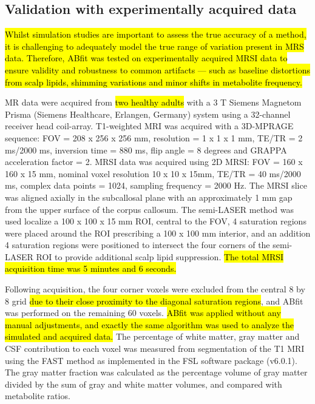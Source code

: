 \documentclass[num-refs]{wiley-article}
\newcommand{\revone}[2]{\hl{#1}\marginnote{\hl{#2}}}
\begin{document}
\subsection{Validation with experimentally acquired data}
\revone{Whilst simulation studies are important to assess the true accuracy of a method, it is challenging to adequately model the true range of variation present in MRS data. Therefore, ABfit was tested on experimentally acquired MRSI data to ensure validity and robustness to common artifacts --- such as baseline distortions from scalp lipids, shimming variations and minor shifts in metabolite frequency.}{R1.4}

MR data were acquired from \revone{two healthy adults}{R1.4,\linebreak R1.27} with a 3 T Siemens Magnetom Prisma (Siemens Healthcare, Erlangen, Germany) system using a 32-channel receiver head coil-array. T1-weighted MRI was acquired with a 3D-MPRAGE sequence: FOV = 208 x 256 x 256 mm, resolution = 1 x 1 x 1 mm, TE/TR = 2 ms/2000 ms, inversion time = 880 ms, flip angle = 8 degrees and GRAPPA acceleration factor = 2. MRSI data was acquired using 2D MRSI: FOV = 160 x 160 x 15 mm, nominal voxel resolution 10 x 10 x 15mm, TE/TR = 40 ms/2000 ms, complex data points = 1024, sampling frequency = 2000 Hz. The MRSI slice was aligned axially in the subcallosal plane with an approximately 1 mm gap from the upper surface of the corpus callosum. The semi-LASER method \cite{Scheenen2008} was used localize a 100 x 100 x 15 mm ROI, central to the FOV, 4 saturation regions were placed around the ROI prescribing a 100 x 100 mm interior, and an addition 4 saturation regions were positioned to intersect the four corners of the semi-LASER ROI to provide additional scalp lipid suppression. \revone{The total MRSI acquisition time was 5 minutes and 6 seconds.}{R1.23}

Following acquisition, the four corner voxels were excluded from the central 8 by 8 grid \revone{due to their close proximity to the diagonal saturation regions}{R1.24}, and ABfit was performed on the remaining 60 voxels. \revone{ABfit was applied without any manual adjustments, and exactly the same algorithm was used to analyze the simulated and acquired data.}{R1.27} The percentage of white matter, gray matter and CSF contribution to each voxel was measured from segmentation of the T1 MRI using the FAST method \cite{Zhang2001} as implemented in the FSL software package (v6.0.1). The gray matter fraction was calculated as the percentage volume of gray matter divided by the sum of gray and white matter volumes, and compared with metabolite ratios.
\end{document}
